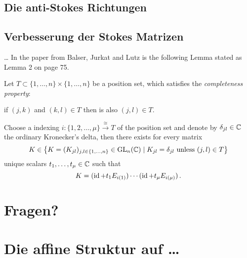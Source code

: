 \subsection{Die anti-Stokes Richtungen}

\subsection{Verbesserung der Stokes Matrizen}
\begin{frame}[t]{\dots}
  In the paper \cite{BJL1979Birkhoff} from Balser, Jurkat and Lutz is the
  following Lemma stated as Lemma 2 on page 75.
  \begin{lem}\label{lem:UniqueDecompositionWotBlocks}
    Let $T\subset\{1,\dots,n\}\times\{1,\dots,n\}$ be a position set, which
    satisfies the \emph{completeness property}:
    \begin{einr}
      if $(j,k)$ and $(k,l)\in T$ then is also $(j,l)\in T$.
    \end{einr}
    Choose a indexing $i:\{1,2,\dots,\mu \} \overset{\cong}{\to}T$ of the
    position set and denote by $\delta_{jl}\in\mathbb{C}$ the ordinary Kronecker's
    delta, then there exists for every matrix
    \[
      K\in \left\{K=(K_{jl})_{j,l\in\{1,\dots,n\}}\in\operatorname{GL}_n(\mathbb{C})\mid
        K_{jl}=\delta_{jl} \text{~unless~} (j,l)\in T \right\}
    \]
    unique scalars $t_1,\dots,t_\mu\in\mathbb{C}$ such that
    \[
      K=(\operatorname{id} + t_1E_{i(1)})\cdots(\operatorname{id} + t_{\mu}E_{i(\mu)}) \,.
    \]
  \end{lem}
\end{frame}

\section*{Fragen?}

\section{Die affine Struktur auf \dots}


